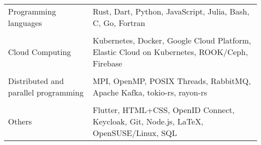 \documentclass[10pt]{article}
\begin{document}
\begin{tabu} to \linewidth {lX}
Programming languages
& Rust, Dart, Python, JavaScript, Julia, Bash, C, Go, Fortran \\
& \\
Cloud Computing
& Kubernetes, Docker, Google Cloud Platform, Elastic Cloud on
  Kubernetes, ROOK/Ceph, Firebase \\
& \\
Distributed and parallel programming
& MPI, OpenMP, POSIX Threads, RabbitMQ, Apache Kafka, tokio-rs,
  rayon-rs \\
& \\
Others
& Flutter, HTML+CSS, OpenID Connect, Keycloak, Git, Node.js, {\LaTeX},
  OpenSUSE/Linux, SQL \\
\end{tabu}
\end{document}
